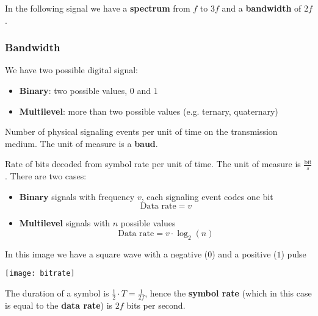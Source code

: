 \begin{example}
	In the following signal we have a \textbf{spectrum} from $f$ to $3f$ and a \textbf{bandwidth} of $2f$.
	\begin{figure}[!h]
		\hfil
		\hfil
	\end{figure}
\end{example}

\subsubsection{Bandwidth}
We have two possible digital signal:
\begin{itemize}
	\item \textbf{Binary}: two possible values, $0$ and $1$
	\item \textbf{Multilevel}: more than two possible values (e.g. ternary, quaternary)
\end{itemize}
\begin{definition}
	Number of physical signaling events per unit of time on the transmission medium. The unit of measure is a \textbf{baud}.
\end{definition}
\begin{definition}
	Rate of bits decoded from symbol rate per unit of time. The unit of measure is $\frac{\text{bit}}{s}$. There are two cases:
	\begin{itemize}
		\item \textbf{Binary} signals with frequency $v$, each signaling event codes one bit
		\begin{equation*}
			\text{Data rate}=v
		\end{equation*}
		\item \textbf{Multilevel} signals with $n$ possible values
		\begin{equation*}
			\text{Data rate}=v \cdot \log_2(n)
		\end{equation*}
	\end{itemize}
\end{definition}

\begin{example}
	In this image we have a square wave with a negative ($0$) and a positive ($1$) pulse 
	\begin{center}
		\texttt{[image: bitrate]}
	\end{center}
	The duration of a symbol is $\frac{1}{2} \cdot T = \frac{1}{2f}$, hence the \textbf{symbol rate} (which in this case is equal to the \textbf{data rate}) is $2f$ bits per second.
\end{example}

